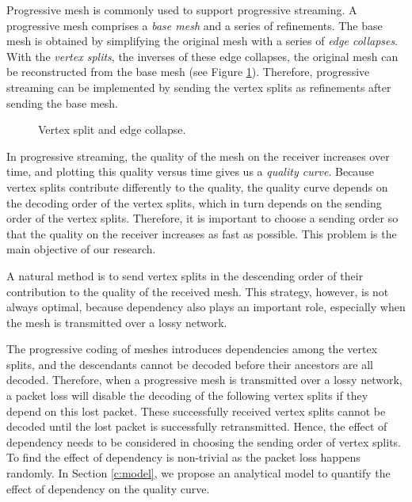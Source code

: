 \documentclass{sig-alt-release2}
\begin{document}
    
    Progressive mesh \cite{237216} is commonly used to support progressive
    streaming. A progressive mesh comprises a \emph{base mesh} and a series
    of refinements. The base mesh is obtained by simplifying the original mesh
    with a series of \emph{edge collapses}.
    With the \emph{vertex splits}, the inverses of these edge
    collapses, the original mesh can be reconstructed from the base mesh (see Figure \ref{split}).
    Therefore, progressive streaming can be implemented by sending the vertex
    splits as refinements after sending the base mesh.
    \begin{figure}
    \centering
    \caption{%
    Vertex split and edge collapse. 
    \label{split}}
    \end{figure}
    
    In progressive streaming, the quality of the mesh on the receiver
    increases over time, and plotting this quality versus time gives us a \emph{quality curve}. 
    Because vertex splits contribute differently
    to the quality,
    the quality curve depends on the decoding order of the vertex splits,
    which in turn depends on the sending order of the vertex splits.
    Therefore, it is important to choose a sending order so that the 
    quality on the receiver increases as fast as possible.
    This problem is the main objective of our research. 
       
    A natural method is to send vertex splits in the descending order of their contribution to the quality of the received mesh. This strategy, however, is not always optimal, 
    because dependency also plays an important role,
    especially when the mesh is transmitted over a lossy network.
    
    The progressive coding of meshes introduces dependencies among 
    the vertex splits, and the descendants cannot be decoded
    before their ancestors are all decoded. Therefore, 
    when a progressive mesh is transmitted over a lossy network,
    a packet loss will disable the decoding of the following
    vertex splits if they depend on this lost packet. 
    These successfully received vertex splits cannot be 
    decoded until the lost packet is successfully retransmitted. 
    Hence, the effect of dependency needs to
    be considered in choosing the sending order of vertex splits. 
    To find the effect of dependency
    is non-trivial as the packet loss happens randomly.
    In Section \ref{c:model}, we propose
    an analytical model to quantify the effect of dependency on
    the quality curve.
    
\end{document}
